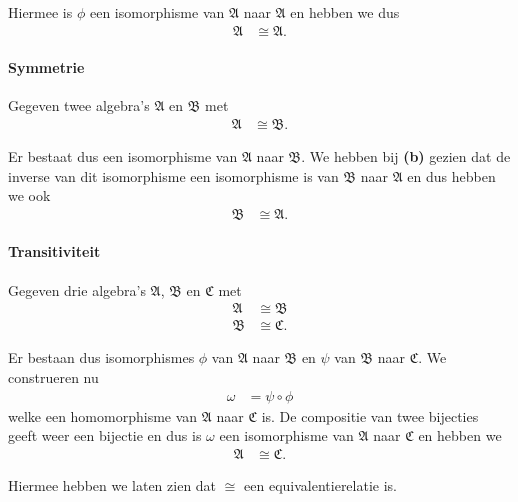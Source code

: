 \documentclass[a4paper,11pt]{article}
\begin{document}
\begin{description}
Hiermee is $\phi$ een isomorphisme van $\mathfrak{A}$ naar $\mathfrak{A}$ en
hebben we dus
\begin{align*}
\mathfrak{A} &\cong \mathfrak{A}.
\end{align*}

\paragraph{Symmetrie}

Gegeven twee algebra's $\mathfrak{A}$ en $\mathfrak{B}$ met
\begin{align*}
\mathfrak{A} &\cong \mathfrak{B}.
\end{align*}

Er bestaat dus een isomorphisme van $\mathfrak{A}$ naar $\mathfrak{B}$. We
hebben bij {\bf (b)} gezien dat de inverse van dit isomorphisme een
isomorphisme is van $\mathfrak{B}$ naar $\mathfrak{A}$ en dus hebben we ook
\begin{align*}
\mathfrak{B} &\cong \mathfrak{A}.
\end{align*}

\paragraph{Transitiviteit}

Gegeven drie algebra's $\mathfrak{A}$, $\mathfrak{B}$ en $\mathfrak{C}$ met
\begin{align*}
\mathfrak{A} &\cong \mathfrak{B} \\
\mathfrak{B} &\cong \mathfrak{C}.
\end{align*}

Er bestaan dus isomorphismes $\phi$ van $\mathfrak{A}$ naar $\mathfrak{B}$ en
$\psi$ van $\mathfrak{B}$ naar $\mathfrak{C}$. We construeren nu
\begin{align*}
\omega &= \psi \circ \phi
\end{align*}
welke een homomorphisme van $\mathfrak{A}$ naar $\mathfrak{C}$ is. De
compositie van twee bijecties geeft weer een bijectie en dus is $\omega$ een
isomorphisme van $\mathfrak{A}$ naar $\mathfrak{C}$ en hebben we
\begin{align*}
\mathfrak{A} &\cong \mathfrak{C}.
\end{align*}

Hiermee hebben we laten zien dat $\cong$ een equivalentierelatie is.\\[2em]

\end{description}
\end{document}
